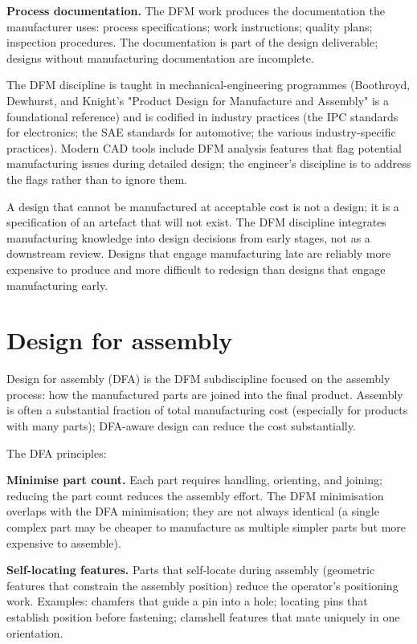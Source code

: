 \textbf{Process documentation.} The DFM work produces the documentation the manufacturer uses: process specifications; work instructions; quality plans; inspection procedures. The documentation is part of the design deliverable; designs without manufacturing documentation are incomplete.

The DFM discipline is taught in mechanical-engineering programmes (Boothroyd, Dewhurst, and Knight's "Product Design for Manufacture and Assembly" is a foundational reference) and is codified in industry practices (the IPC standards for electronics; the SAE standards for automotive; the various industry-specific practices). Modern CAD tools include DFM analysis features that flag potential manufacturing issues during detailed design; the engineer's discipline is to address the flags rather than to ignore them.

\begin{principle}
A design that cannot be manufactured at acceptable cost is not a design; it is a specification of an artefact that will not exist. The DFM discipline integrates manufacturing knowledge into design decisions from early stages, not as a downstream review. Designs that engage manufacturing late are reliably more expensive to produce and more difficult to redesign than designs that engage manufacturing early.
\end{principle}

\section{Design for assembly}

Design for assembly (DFA) is the DFM subdiscipline focused on the assembly process: how the manufactured parts are joined into the final product. Assembly is often a substantial fraction of total manufacturing cost (especially for products with many parts); DFA-aware design can reduce the cost substantially.

The DFA principles:

\textbf{Minimise part count.} Each part requires handling, orienting, and joining; reducing the part count reduces the assembly effort. The DFM minimisation overlaps with the DFA minimisation; they are not always identical (a single complex part may be cheaper to manufacture as multiple simpler parts but more expensive to assemble).

\textbf{Self-locating features.} Parts that self-locate during assembly (geometric features that constrain the assembly position) reduce the operator's positioning work. Examples: chamfers that guide a pin into a hole; locating pins that establish position before fastening; clamshell features that mate uniquely in one orientation.

